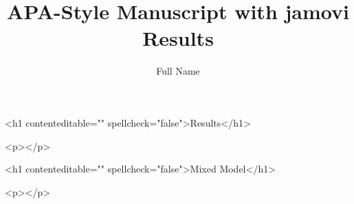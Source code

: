 \documentclass[a4paper,man,hidelinks,floatsintext]{apa7}
\title{APA-Style Manuscript with jamovi Results}
\author{Full Name}
\affiliation{Your Affilitation}
\begin{document}










<h1 contenteditable="" spellcheck="false">Results</h1>
           
      
        <p></p>
      
    
      
      
    
            <h1 contenteditable="" spellcheck="false">Mixed Model</h1>
           
      
        <p></p>
      
\end{document}
